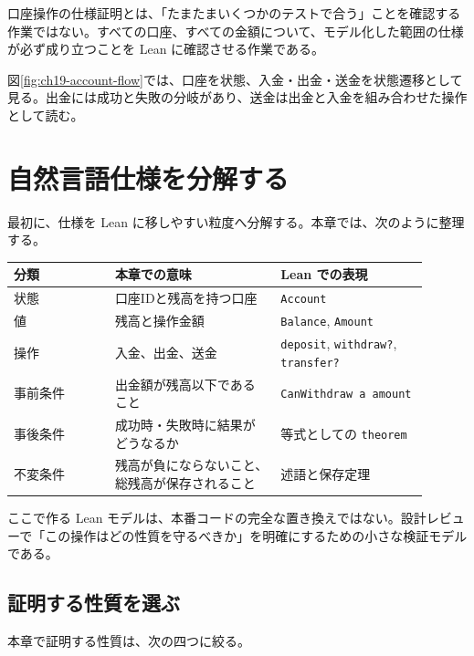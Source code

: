 \begin{intuitionbox}
口座操作の仕様証明とは、「たまたまいくつかのテストで合う」ことを確認する作業ではない。すべての口座、すべての金額について、モデル化した範囲の仕様が必ず成り立つことを Lean に確認させる作業である。
\end{intuitionbox}


図\ref{fig:ch19-account-flow}では、口座を状態、入金・出金・送金を状態遷移として見る。出金には成功と失敗の分岐があり、送金は出金と入金を組み合わせた操作として読む。

\section{自然言語仕様を分解する}

最初に、仕様を Lean に移しやすい粒度へ分解する。本章では、次のように整理する。

\begin{longtable}{p{0.22\linewidth}p{0.36\linewidth}p{0.32\linewidth}}
\toprule
分類 & 本章での意味 & Lean での表現 \\
\midrule
状態 & 口座IDと残高を持つ口座 & \texttt{Account} \\
値 & 残高と操作金額 & \texttt{Balance}, \texttt{Amount} \\
操作 & 入金、出金、送金 & \texttt{deposit}, \texttt{withdraw?}, \texttt{transfer?} \\
事前条件 & 出金額が残高以下であること & \texttt{CanWithdraw a amount} \\
事後条件 & 成功時・失敗時に結果がどうなるか & 等式としての \texttt{theorem} \\
不変条件 & 残高が負にならないこと、総残高が保存されること & 述語と保存定理 \\
\bottomrule
\end{longtable}

\begin{softwarebox}
ここで作る Lean モデルは、本番コードの完全な置き換えではない。設計レビューで「この操作はどの性質を守るべきか」を明確にするための小さな検証モデルである。
\end{softwarebox}

\subsection{証明する性質を選ぶ}

本章で証明する性質は、次の四つに絞る。

